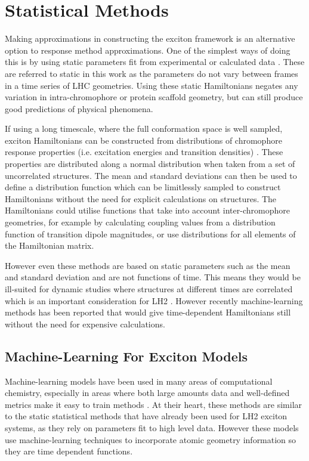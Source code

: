 \section{Statistical Methods}
\label{sec:stats_methods}

Making approximations in constructing the exciton framework is an alternative option
to response method approximations. One of the simplest ways of doing this is by 
using static parameters fit from experimental or calculated data \cite{Cory1998, Hu1997, Tretiak2000}. 
These are referred to static in this work as the parameters do not vary between 
frames in a time series of LHC geometries. Using these static Hamiltonians negates
any variation in intra-chromophore or protein scaffold geometry, but can still produce
good predictions of physical phenomena.

If using a long timescale, where the full conformation space is well sampled, exciton
Hamiltonians can be constructed from distributions of chromophore response properties
(i.e. excitation energies and transition densities) \cite{Stross2016}. These properties
are distributed along a normal distribution when taken from a set of uncorrelated 
structures. The mean and standard deviations can then be used to define a distribution
function which can be limitlessly sampled to construct Hamiltonians without the 
need for explicit calculations on structures. The Hamiltonians could utilise functions
that take into account inter-chromophore geometries, for example by calculating 
coupling values from a distribution function of transition dipole magnitudes, or
use distributions for all elements of the Hamiltonian matrix.

However even these methods are based on static parameters such as the mean and standard
deviation and are not functions of time. This means they would be ill-suited for
dynamic studies where structures at different times are correlated which is an important
consideration for LH2 \cite{Papiz2003}. However recently machine-learning methods
has been reported that would give time-dependent Hamiltonians still without the 
need for expensive calculations.

\subsection{Machine-Learning For Exciton Models}
\label{subsec:machine_learning} 

Machine-learning models have been used in many areas of computational chemistry,
especially in areas where both large amounts data and well-defined metrics make 
it easy to train  methods \cite{Dral2020, Behler2011, Westermayr2020, Schutt2019, Sajjan2022}.
At their heart, these methods are similar to the static statistical methods that
have already been used for LH2 exciton systems, as they rely on parameters fit to
high level data. However these models use machine-learning techniques to incorporate 
atomic geometry information so they are time dependent functions.

